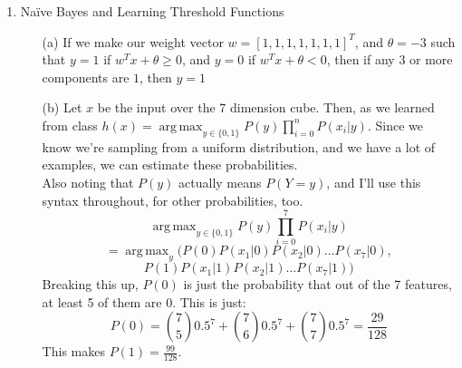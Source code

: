 
\usepackage{amsmath,float,mathtools}
\usepackage[]{units}

\DeclareMathOperator*{\argmax}{arg\,max}
\DeclarePairedDelimiter\ceil{\lceil}{\rceil}
\DeclarePairedDelimiter\floor{\lfloor}{\rfloor}
\newcommand{\tight}[1]{\!#1\!}
\newcommand{\loose}[1]{\;#1\;}


\oddsidemargin 0in
\evensidemargin 0in
\textwidth 6.5in
\topmargin -0.5in
\textheight 9.0in




\pagestyle{myheadings}

\begin{enumerate}
\item Na{\"i}ve Bayes and Learning Threshold Functions
  \begin{enumerate}
  \item [(a)] If we make our weight vector $w = [1,1,1,1,1,1,1]^T$, and $\theta = -3$ such that $y=1$ if $w^Tx + \theta \geq 0$, and $y=0$ if $w^Tx + \theta < 0$, then if any $3$ or more components are $1$, then $y=1$
  \item [(b)] Let $x$ be the input over the 7 dimension cube. Then, as we learned from class $h(x) = \argmax_{y \in \{0,1\}} P(y) \prod_{i=0}^n P(x_i | y)$. Since we know we're sampling from a uniform distribution, and we have a lot of examples, we can estimate these probabilities.\\
    Also noting that $P(y)$ actually means $P(Y=y)$, and I'll use this syntax throughout, for other probabilities, too.
    $$\argmax_{y \in \{0,1\}} P(y) \prod_{i=0}^7 P(x_i | y)$$
    $$ = \argmax_y(P(0)P(x_1|0)P(x_2|0)\ldots P(x_7|0),$$
    $$P(1)P(x_1|1)P(x_2|1)\ldots P(x_7|1))$$
    Breaking this up, $P(0)$ is just the probability that out of the 7 features, at least 5 of them are 0. This is just: 
    $$P(0) = \binom 7 5 0.5^7 + \binom 7 6 0.5^7 + \binom 7 7 0.5^7 = \frac{29}{128}$$ 
    This makes $P(1) = \frac{99}{128}$.
    

\end{enumerate}
\end{enumerate}
